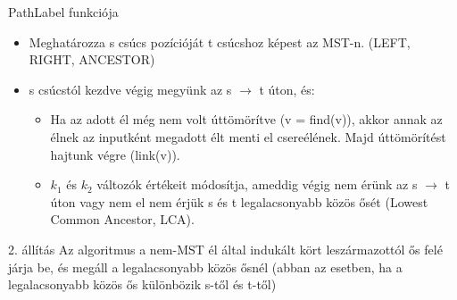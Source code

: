 \begin{frame}{PathLabel funkciója}
  \begin{itemize}
    \item Meghatározza s csúcs pozícióját t csúcshoz képest az MST-n. (LEFT, RIGHT, ANCESTOR)
    \item s csúcstól kezdve végig megyünk az s $\rightarrow$ t úton, és:
    \begin{itemize}
      \item Ha az adott él még nem volt úttömörítve (v = find(v)), akkor annak az élnek az inputként megadott élt menti el csereélének. Majd úttömörítést hajtunk végre (link(v)).
      \item $k_1$ és $k_2$ változók értékeit módosítja, ameddig végig nem érünk az s $\rightarrow$ t úton vagy nem el nem érjük s és t legalacsonyabb közös ősét (Lowest Common Ancestor, LCA).
    \end{itemize}
  \end{itemize}
  \begin{block}{2. állítás}
    Az algoritmus a nem-MST él által indukált kört leszármazottól ős felé járja be, és megáll a legalacsonyabb közös ősnél (abban az esetben, ha a legalacsonyabb közös ős különbözik s-től és t-től)
  \end{block}
\end{frame}